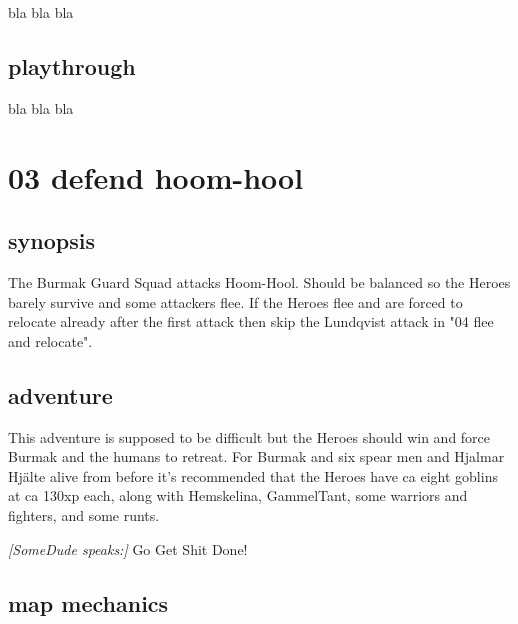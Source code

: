 bla bla bla


\subsection*{playthrough}

bla bla bla







\newpage
\section*{03 defend hoom-hool}



\subsection*{synopsis}

The Burmak Guard Squad attacks Hoom-Hool. Should be balanced so the Heroes barely survive and some attackers flee. If the Heroes flee and are forced to relocate already after the first attack then skip the Lundqvist attack in "04 flee and relocate".


\subsection*{adventure}

This adventure is supposed to be difficult but the Heroes should win and force Burmak and the humans to retreat.
For Burmak and six spear men and Hjalmar Hjälte alive from before it's recommended that the Heroes have ca eight goblins at ca 130xp each, along with Hemskelina, GammelTant, some warriors and fighters, and some runts.

\begin{readoutloud}
\emph{[SomeDude speaks:]}
Go Get Shit Done!
\end{readoutloud}


\subsection*{map mechanics}

